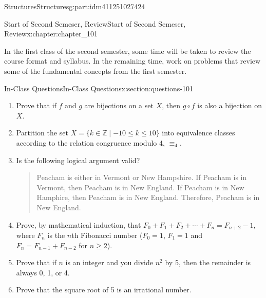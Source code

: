 \documentclass[oneside,10pt,]{book}
\numberwithin{equation}{section}
\begin{document}
%
%
\typeout{************************************************}
\typeout{************************************************}
%
\begin{partptx}{Structures}{}{Structures}{}{}{g:part:idm411251027424}
%
\typeout{************************************************}
\typeout{************************************************}
%
\begin{chapterptx}{Start of Second Semeser, Review}{}{Start of Second Semeser, Review}{}{}{x:chapter:chapter_101}
\begin{introduction}{}%
In the first class of the second semester, some time will be taken to review the course format and syllabus.  In the remaining time, work on problems that review some of the fundamental concepts from the first semester.%
\end{introduction}%
%
%
\typeout{************************************************}
\typeout{************************************************}
%
\begin{sectionptx}{In-Class Questions}{}{In-Class Questions}{}{}{x:section:questions-101}
%
\begin{enumerate}[label=\arabic*.]
\item{}Prove that if \(f\) and \(g\) are bijections on a set \(X\), then \(g \circ f\) is also a bijection on \(X\).%
\item{}Partition the set \(X=\{k \in \mathbb{Z} \mid  -10 \leq k \leq 10\}\) into equivalence classes according to the relation congruence modulo 4, \(\equiv_4\).%
\item{}Is the following logical argument valid?%
\begin{quote}%
Peacham is either in Vermont or New Hampshire. If Peacham is in Vermont, then Peacham is in New England. If Peacham is in New Hamphire, then Peacham is in New England. Therefore, Peacham is in New England.%
\end{quote}
\item{}Prove, by mathematical induction, that \(F_0 + F_1 + F_2 + \cdots + F_{n} = F_{n+2} - 1\), where \(F_n\) is the \(n\)th Fibonacci number (\(F_0 = 1\), \(F_1 = 1\) and \(F_n = F_{n-1} + F_{n-2}\) for \(n\geq 2\)).%
\item{}Prove that if \(n\) is an integer and you divide \(n^2\) by 5, then the remainder is always 0, 1, or 4.%
\item{}Prove that the square root of 5 is an irrational number.%
\end{enumerate}

\end{sectionptx}
\end{chapterptx}
\end{partptx}
\end{document}
